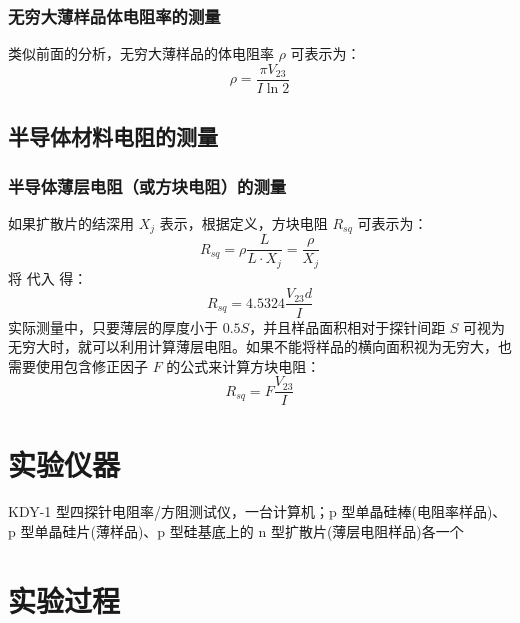         \subsubsection{无穷大薄样品体电阻率的测量}
            类似前面的分析，无穷大薄样品的体电阻率 $\rho$ 可表示为：
            \begin{equation}
                \rho =\frac{\pi V_{23}}{I \ln 2} \label{equ:A11.1}
            \end{equation}
    \subsection{半导体材料电阻的测量}        
        \subsubsection{半导体薄层电阻（或方块电阻）的测量}
            如果扩散片的结深用 $X_j$ 表示，根据定义，方块电阻 $R_{sq}$ 可表示为：
            \begin{equation}
                R_{sq}=\rho\frac{L}{L\cdot X_{j}}=\frac{\rho}{X_{j}} \label{equ:A11.2}
            \end{equation}
            将  代入  得：
            \begin{equation}
                R_{sq}=4.5324\frac{V_{23} d}{I} \label{equ:A11.3}
            \end{equation}
            实际测量中，只要薄层的厚度小于 $0.5S$，并且样品面积相对于探针间距 $S$ 可视为无穷大时，就可以利用计算薄层电阻。如果不能将样品的横向面积视为无穷大，也需要使用包含修正因子 $F$ 的公式来计算方块电阻：
            \begin{equation}
                R_{sq}= F \frac{V_{23}}{I} \label{equ:A11.4}
            \end{equation}
        
\section{实验仪器}%
    KDY-1 型四探针电阻率/方阻测试仪，一台计算机；p 型单晶硅棒(电阻率样品)、p 型单晶硅片(薄样品)、p 型硅基底上的 n 型扩散片(薄层电阻样品)各一个
\section{实验过程}%
